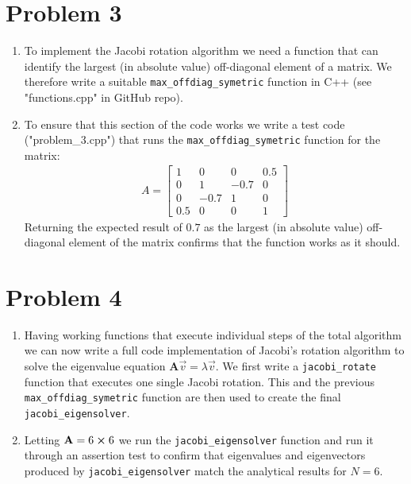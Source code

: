 \documentclass[english,notitlepage]{revtex4-1}  %
\begin{document}
\section*{Problem 3}
\begin{enumerate}[label= \alph*)]
    \item
    To implement the Jacobi rotation algorithm we need a function that can identify the largest (in absolute value)
    off-diagonal element of a matrix. We therefore write a suitable \texttt{max\_offdiag\_symetric} function in C++ (see "functions.cpp" in GitHub repo).

    \item
    To ensure that this section of the code works we write a test code ("problem\_3.cpp") that runs the \texttt{max\_offdiag\_symetric} function
    for the matrix:
    \begin{align*}
        A = \begin{bmatrix}
            1 & 0 & 0 & 0.5 \\
            0 & 1 & -0.7 & 0 \\
            0 & -0.7 & 1 & 0 \\
            0.5 & 0 & 0 & 1
        \end{bmatrix}
    \end{align*}
    Returning the expected result of $0.7$ as the largest (in absolute value)
    off-diagonal element of the matrix confirms that the function works as it should.
\end{enumerate}

\section*{Problem 4}
\begin{enumerate}[label= \alph*)]
    \item Having working functions that execute individual steps of the total algorithm we can
    now write a full code implementation of Jacobi's rotation algorithm to solve the eigenvalue
    equation $\textbf{A} \vec{v} = \lambda \vec{v}$. We first write a \texttt{jacobi\_rotate}
    function that executes one single Jacobi rotation. This and the previous \texttt{max\_offdiag\_symetric}
    function are then used to create the final \texttt{jacobi\_eigensolver}.
    \item Letting $\textbf{A} = 6 \cross 6$ we run the \texttt{jacobi\_eigensolver} function and run
    it through an assertion test to confirm that eigenvalues and eigenvectors produced by \texttt{jacobi\_eigensolver}
    match the analytical results for $N = 6$.
\end{enumerate}
\end{document}

